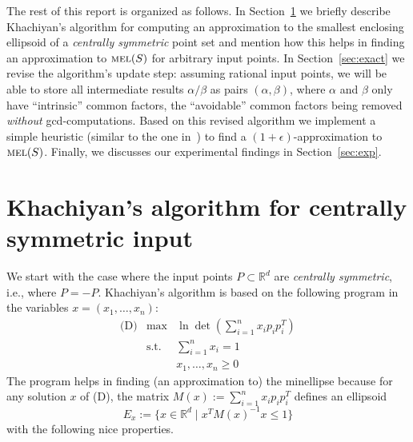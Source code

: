 \documentclass[a4paper,twocolumn]{article}
\newcommand{\R}{\ensuremath{\mathbb{R}}}
\newcommand{\MEL}{\ensuremath{\mathop{\textnormal{\textsc{mel}}}\nolimits}}
\begin{document}
The rest of this report is organized as follows.  In
Section~\ref{sec:khachiyan} we briefly describe Khachiyan's algorithm
for computing an approximation to the smallest enclosing ellipsoid of
a \emph{centrally symmetric} point set and mention how this helps in
finding an approximation to $\MEL(S)$ for arbitrary input points.  In
Section~\ref{sec:exact} we revise the algorithm's update step:
assuming rational input points, we will be able to store all
intermediate results $\alpha/\beta$ as pairs $(\alpha,\beta)$, where
$\alpha$ and $\beta$ only have ``intrinsic'' common factors, the
``avoidable'' common factors being removed \emph{without}
gcd-computations.  Based on this revised algorithm we implement a
simple heuristic (similar to the one in~\cite{kmy-ccsasehhd-03}) to
find a $(1+\epsilon)$-approximation to $\MEL(S)$.  Finally, we
discusses our experimental findings in Section~\ref{sec:exp}.

\section{Khachiyan's algorithm for centrally symmetric input}
\label{sec:khachiyan}

We start with the case where the input points $P\subset \R^d$ are
\emph{centrally symmetric}, i.e., where $P=-P$.  Khachiyan's algorithm
is based on the following program in the variables
$x=(x_1,\ldots,x_n)$:
\begin{equation}
  \label{eq:dual}
  \begin{array}{lll}
    \mbox{(D)} & \mbox{max}  & \ln \det(\sum_{i=1}^n x_i p_i p_i^T) \\
    & \mbox{s.t.} & \sum_{i=1}^n x_i = 1 \\
    &             & x_1,\ldots,x_n \ge 0
  \end{array}
\end{equation}
The program helps in finding (an approximation to) the minellipse
because for any solution $x$ of (D), the matrix $M(x):= \sum_{i=1}^n
x_i p_i p_i^T$ defines an ellipsoid
\begin{equation}
  \label{eq:sol_ell}
  E_x:= \{ x \in \R^d \mid x^T M(x)^{-1} x \le 1 \}
\end{equation}
with the following nice properties.
\end{document}
